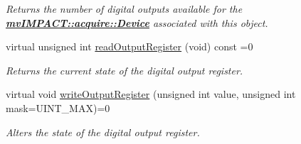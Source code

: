 \begin{DoxyCompactItemize}
\begin{DoxyCompactList}\small\item\em Returns the number of digital outputs available for the {\bfseries \hyperlink{classmv_i_m_p_a_c_t_1_1acquire_1_1_device}{mv\+I\+M\+P\+A\+C\+T\+::acquire\+::\+Device}} associated with this object. \end{DoxyCompactList}\item 
virtual unsigned int \hyperlink{classmv_i_m_p_a_c_t_1_1acquire_1_1_i_o_sub_system_a8c39de7c726456fcb01b692cfff83e75}{read\+Output\+Register} (void) const =0
\begin{DoxyCompactList}\small\item\em Returns the current state of the digital output register. \end{DoxyCompactList}\item 
virtual void \hyperlink{classmv_i_m_p_a_c_t_1_1acquire_1_1_i_o_sub_system_a196daf5a92ce713e5bd7a192aa1bef17}{write\+Output\+Register} (unsigned int value, unsigned int mask=U\+I\+N\+T\+\_\+\+M\+A\+X)=0
\begin{DoxyCompactList}\small\item\em Alters the state of the digital output register. \end{DoxyCompactList}\end{DoxyCompactItemize}
